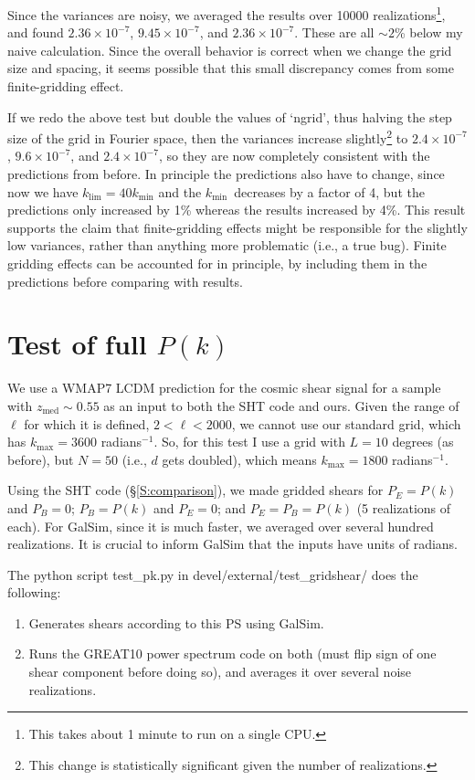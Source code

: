 \documentclass[preprint]{aastex}
\newcommand{\klim}{\ensuremath{k_\mathrm{lim}}}
\newcommand{\kmax}{\ensuremath{k_\mathrm{max}}}
\newcommand{\kmin}{\ensuremath{k_\mathrm{min}}}
\begin{document}
Since the variances are noisy, we averaged the results over 10000
realizations\footnote{This takes about 1 minute to run on a single
  CPU.}, and found $2.36\times 10^{-7}$, $9.45\times 10^{-7}$, and
$2.36\times 10^{-7}$.  These are all $\sim 2$\% below my naive calculation.
Since the overall behavior is correct when we change the grid size and
spacing, it seems possible that this small discrepancy comes from some
finite-gridding effect.

If we redo the above test but double the values of `ngrid', thus
halving the step size of the grid in Fourier space, then the variances
increase slightly\footnote{This change is statistically significant given
the number of realizations.} to $2.4\times 10^{-7}$, $9.6\times 10^{-7}$, and
$2.4\times 10^{-7}$, so they are now completely consistent with the
predictions from before.  In principle the predictions also have to
change, since now we have $\klim=40\kmin$ and the \kmin\ decreases by
a factor of 4, but the predictions only increased by 1\% whereas the
results increased by 4\%.  This result supports the claim that finite-gridding
effects might be responsible for the slightly low variances, rather
than anything more problematic (i.e., a true bug).  Finite gridding
effects can be accounted for in principle, by including them in the
predictions before comparing with results.

\section{Test of full $P(k)$}\label{S:testpk}

We use a WMAP7 LCDM prediction for the cosmic shear signal for a
sample with $z_\mathrm{med}\sim 0.55$ as an input to both
the SHT code and ours.  Given the range of $\ell$ for which it is
defined, $2<\ell<2000$, we cannot use our standard grid, which 
has $\kmax=3600$ radians$^{-1}$.  So, for this test I use a grid with
$L=10$ degrees (as before), but $N=50$ (i.e., $d$ gets doubled), which
means $\kmax=1800$ radians$^{-1}$.

Using the SHT code (\S\ref{S:comparison}), we made gridded shears for
$P_E=P(k)$ and $P_B=0$; $P_B=P(k)$ and $P_E=0$; and $P_E=P_B=P(k)$ (5
realizations of each).  For GalSim, since it is much faster, we
averaged over several hundred realizations.  It is crucial to inform
GalSim that the inputs have units of radians.

The python script test\_pk.py in devel/external/test\_gridshear/ does the following:
\begin{enumerate}
\item Generates shears according to this PS using GalSim.
\item Runs the GREAT10 power spectrum code on both (must flip sign of
  one shear component before doing so), and averages it over several
  noise realizations.
\end{enumerate}
\end{document}
